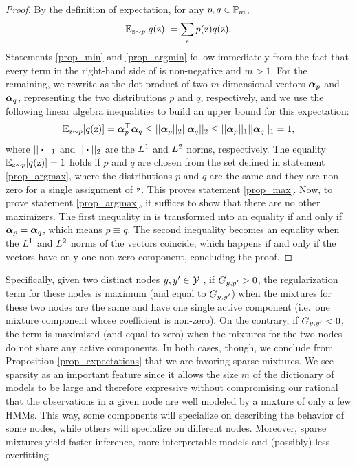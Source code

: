\begin{proof}
	By the definition of expectation, for any $p, q \in {\mathbb{P}}_m$,
	\begin{equation}
	\label{prop_expdef}
	\mathbb{E}_{{\textnormal{z}}\sim p} [ q({\textnormal{z}}) ] = \sum_{{\textnormal{z}}} p({\textnormal{z}}) q({\textnormal{z}}).
	\end{equation}
	Statements \ref{prop_min} and \ref{prop_argmin} follow immediately from the fact that every term in the right-hand side of  is non-negative and $m>1$. For the remaining, we rewrite  as the dot product of two $m$-dimensional vectors ${\bm{\alpha}}_p$ and ${\bm{\alpha}}_q$, representing the two distributions $p$ and $q$, respectively, and we use the following linear algebra inequalities to build an upper bound for this expectation:
	\begin{equation}
	\label{prop_ineq}
	\mathbb{E}_{{\textnormal{z}}\sim p} [ q({\textnormal{z}}) ] = {\bm{\alpha}}_p ^\top {\bm{\alpha}}_q \leq || {\bm{\alpha}}_p ||_2 || {\bm{\alpha}}_q ||_2 \leq || {\bm{\alpha}}_p ||_1 || {\bm{\alpha}}_q ||_1 =1,
	\end{equation}
	where $||\boldsymbol{\cdot}||_1$ and $||\boldsymbol{\cdot}||_2$ are the $L^1$ and $L^2$ norms, respectively. The equality $\mathbb{E}_{{\textnormal{z}}\sim p} [ q({\textnormal{z}}) ] \allowbreak= 1$ holds if $p$ and $q$ are chosen from the set defined in statement \ref{prop_argmax}, where the distributions $p$ and $q$ are the same and they are non-zero for a single assignment of ${\textnormal{z}}$. This proves statement \ref{prop_max}. Now, to prove statement \ref{prop_argmax}, it suffices to show that there are no other maximizers. The first inequality in  is transformed into an equality if and only if ${\bm{\alpha}}_p = {\bm{\alpha}}_q$, which means $p \equiv q$. The second inequality becomes an equality when the $L^1$ and $L^2$ norms of the vectors coincide, which happens if and only if the vectors have only one non-zero component, concluding the proof.
\end{proof}
Specifically, given two distinct nodes $y, y' \in {\mathcal{Y}}$ , if ${G}_{y,y'} > 0$, the regularization term for these nodes is maximum (and equal to ${G}_{y,y'}$) when the mixtures for these two nodes are the same and have one single active component (i.e.\ one mixture component whose coefficient is non-zero). On the contrary, if ${G}_{y,y'} < 0$, the term is maximized (and equal to zero) when the mixtures for the two nodes do not share any active components. In both cases, though, we conclude from Proposition \ref{prop_expectations} that we are favoring sparse mixtures. We see sparsity as an important feature since it allows the size $m$ of the dictionary of models to be large and therefore expressive without compromising our rational that the observations in a given node are well modeled by a mixture of only a few HMMs. This way, some components will specialize on describing the behavior of some nodes, while others will specialize on different nodes. Moreover, sparse mixtures yield faster inference, more interpretable models and (possibly) less overfitting.
